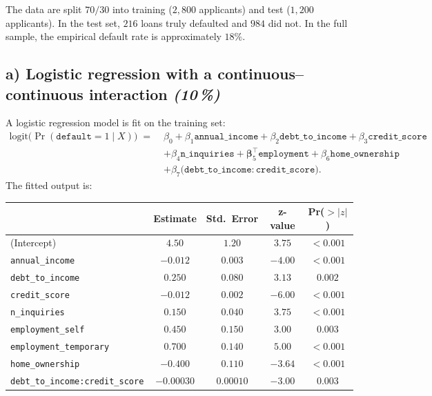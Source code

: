 \documentclass[11pt,a4paper]{article}
\newcommand{\subpoints}[1]{\textit{(#1\,\%)}}
\begin{document}
The data are split $70/30$ into training ($2{,}800$ applicants) and test ($1{,}200$ applicants). In the test set, $216$ loans truly defaulted and $984$ did not. In the full sample, the empirical default rate is approximately $18\%$.

\subsection*{a) Logistic regression with a continuous--continuous interaction \subpoints{10}}

A logistic regression model is fit on the training set:
\begin{align*}
\mathrm{logit}\bigl(\Pr(\texttt{default} = 1 \mid X)\bigr) \;=\; & \beta_0 + \beta_1 \texttt{annual\_income} + \beta_2 \texttt{debt\_to\_income} + \beta_3 \texttt{credit\_score} \\
& + \beta_4 \texttt{n\_inquiries} + \boldsymbol\beta_5^\top \texttt{employment} + \beta_6 \texttt{home\_ownership} \\
& + \beta_7 \bigl(\texttt{debt\_to\_income}\!:\!\texttt{credit\_score}\bigr).
\end{align*}
The fitted output is:

\begin{center}\small
\begin{tabular}{lcccc}
\toprule
 & \textbf{Estimate} & \textbf{Std.\ Error} & \textbf{z-value} & \textbf{Pr($>|z|$)} \\
\midrule
(Intercept)                                            & $4.50$     & $1.20$     & $3.75$  & $<0.001$ \\
\texttt{annual\_income}                                & $-0.012$   & $0.003$    & $-4.00$ & $<0.001$ \\
\texttt{debt\_to\_income}                              & $0.250$    & $0.080$    & $3.13$  & $0.002$  \\
\texttt{credit\_score}                                 & $-0.012$   & $0.002$    & $-6.00$ & $<0.001$ \\
\texttt{n\_inquiries}                                  & $0.150$    & $0.040$    & $3.75$  & $<0.001$ \\
\texttt{employment\_self}                              & $0.450$    & $0.150$    & $3.00$  & $0.003$  \\
\texttt{employment\_temporary}                         & $0.700$    & $0.140$    & $5.00$  & $<0.001$ \\
\texttt{home\_ownership}                               & $-0.400$   & $0.110$    & $-3.64$ & $<0.001$ \\
\texttt{debt\_to\_income:credit\_score}                & $-0.00030$ & $0.00010$  & $-3.00$ & $0.003$  \\
\bottomrule
\end{tabular}
\end{center}
\end{document}
